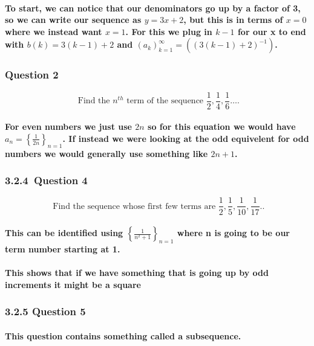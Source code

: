 \paragraph{To start, we can notice that our denominators go up by a factor of 3, so we can write our sequence as $ y=3x+2 $, but this is in terms of $ x=0 $ where we instead want $ x=1 $. For this we plug in $ k-1 $ for our x to end with $ b\left( k \right) =3\left( k-1 \right) +2 $ and $ \left( a_k \right) _{ k=1 }^{ \infty }=\left( \left( 3\left( k-1 \right) +2 \right) ^{ -1 } \right)  $.}

\subsubsection{Question 2}
\[
\text{ Find the }n^{ th }\text{  term of the sequence }\frac{1}{2},\frac{1}{4},\frac{1}{6}\ldots
.\] 
\paragraph{For even numbers we just use $ 2n $ so for this equation we would have $ a_n=\left\{ \frac{1}{2n} \right\} _{ n=1 } $. If instead we were looking at the odd equivelent for odd numbers we would generally use something like $ 2n+1 $. }

\subsubsection*{3.2.4\ Question 4}
\[
\text{ Find the sequence whose first few terms are }\frac{1}{2},\frac{1}{5},\frac{1}{10},\frac{1}{17}.
.\] 

\paragraph{This can be identified using $ \left\{ \frac{1}{n^2+1} \right\}_{ n=1 }  $ where n is going to be our term number starting at 1.}

\paragraph{This shows that if we have something that is going up by odd increments it might be a square}

\subsubsection*{3.2.5 Question 5 }

\paragraph{This question contains something called a subsequence.}


